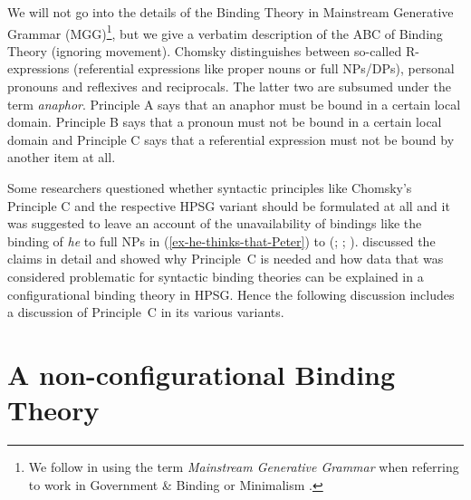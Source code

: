 \documentclass[output=paper
 	        ,biblatex
                ,babelshorthands
                ,newtxmath
                ,draftmode
                ,colorlinks, citecolor=brown
]{langscibook}
\begin{document}
We will not go into the details of the Binding Theory in Mainstream Generative Grammar
(MGG)\footnote{
We follow \citet[]{CJ2005a} in using the term \emph{Mainstream Generative Grammar} when
referring to work in Government \& Binding\indexgb \citep{Chomsky81a} or Minimalism \citep{Chomsky95a-u}.}, but we
give a verbatim description of the ABC of Binding Theory (ignoring movement). Chomsky distinguishes between
so-called R-expressions (referential expressions like proper nouns or full NPs/DPs), personal
pronouns and reflexives and reciprocals. The latter two are subsumed under the term \emph{anaphor}. 
Principle A says that an anaphor must be bound in a certain local domain. Principle B says that a
pronoun must not be bound in a certain local domain and Principle C says that a referential
expression must not be bound by another item at all.

Some researchers questioned whether syntactic principles like Chomsky's Principle C and the
respective HPSG variant should be formulated at all and it was suggested to leave an account of the
unavailability of bindings like the binding of \emph{he} to full NPs in
(\ref{ex-he-thinks-that-Peter}) to  (\citealp[]{Bolinger79a-u}; \citealp[--228]{Bresnan2001a};
\citealp*[]{BMS2001a}). \citet[Section~6]{Walker2011a} discussed the claims in detail
and showed why Principle~C is needed and how data that was considered problematic for syntactic
binding theories can be explained in a configurational binding theory in HPSG. Hence the following
discussion includes a discussion of Principle~C in its various variants.

\section{A non-configurational Binding Theory}
\label{binding:sec-a-non-configurational-binding-theory}
\end{document}
